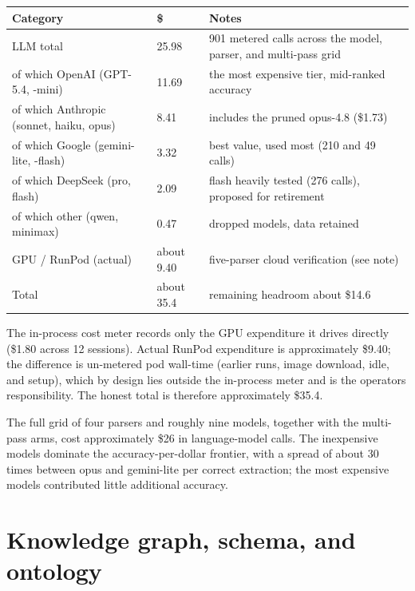 \begin{longtable}[]{@{}L{0.34}L{0.08}L{0.48}@{}}
\toprule\noalign{}
Category & \$ & Notes \\
\midrule\noalign{}
\endhead
\bottomrule\noalign{}
\endlastfoot
LLM total & 25.98 & 901 metered calls across the model, parser, and
multi-pass grid \\
of which OpenAI (GPT-5.4, -mini) & 11.69 & the most expensive tier,
mid-ranked accuracy \\
of which Anthropic (sonnet, haiku, opus) & 8.41 & includes the pruned
opus-4.8 (\$1.73) \\
of which Google (gemini-lite, -flash) & 3.32 & best value, used most
(210 and 49 calls) \\
of which DeepSeek (pro, flash) & 2.09 & flash heavily tested (276
calls), proposed for retirement \\
of which other (qwen, minimax) & 0.47 & dropped models, data retained \\
GPU / RunPod (actual) & about 9.40 & five-parser cloud verification (see
note) \\
Total & about 35.4 & remaining headroom about \$14.6 \\
\end{longtable}

The in-process cost meter records only the GPU expenditure it drives
directly (\$1.80 across 12 sessions). Actual RunPod expenditure is
approximately \$9.40; the difference is un-metered pod wall-time
(earlier runs, image download, idle, and setup), which by design lies
outside the in-process meter and is the operator\textquotesingle s
responsibility. The honest total is therefore approximately \$35.4.

The full grid of four parsers and roughly nine models, together with the
multi-pass arms, cost approximately \$26 in language-model calls. The
inexpensive models dominate the accuracy-per-dollar frontier, with a
spread of about 30 times between opus and gemini-lite per correct
extraction; the most expensive models contributed little additional
accuracy.

\section{Knowledge graph, schema, and
ontology}\label{knowledge-graph-schema-and-ontology}

